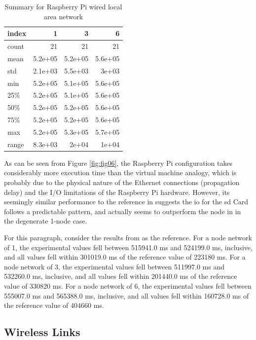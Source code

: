 \begin{table}
\begin{tabular}{lrrr}
\toprule
 index &       1 &       3 &       6 \\
\midrule
 count &      21 &      21 &      21 \\
  mean & 5.2e+05 & 5.2e+05 & 5.6e+05 \\
   std & 2.1e+03 & 5.5e+03 &   3e+03 \\
   min & 5.2e+05 & 5.1e+05 & 5.6e+05 \\
   25\% & 5.2e+05 & 5.1e+05 & 5.6e+05 \\
   50\% & 5.2e+05 & 5.2e+05 & 5.6e+05 \\
   75\% & 5.2e+05 & 5.2e+05 & 5.6e+05 \\
   max & 5.2e+05 & 5.3e+05 & 5.7e+05 \\
 range & 8.3e+03 &   2e+04 &   1e+04 \\
\bottomrule
\end{tabular}
\caption{Summary for Raspberry Pi wired local area network}
\label{table:rp_wired_summary_statistics}
\end{table}

As can be seen from Figure \ref{fig:fig06}, the Raspberry Pi configuration takes considerably more execution time than the virtual machine analogy, which is probably due to the physical nature of the Ethernet connections (propagation delay) and the I/O limitations of the Raspberry Pi hardware.  However, its seemingly similar performance to the reference in \cite{Abramova2014} suggests the \gls{io} for the \gls{sd} Card follows a predictable pattern, and actually seems to outperform the node in \cite{Abramova2014} in the degenerate 1-node case.

For this paragraph, consider the results from \cite{Abramova2014} as the reference.  For a node network of 1, the experimental values fell between 515941.0 ms and 524199.0 ms, inclusive, and all values fell within 301019.0 ms of the reference value of 223180 ms.  For a node network of 3, the experimental values fell between 511997.0 ms and 532260.0 ms, inclusive, and all values fell within 201440.0 ms of the reference value of 330820 ms.  For a node network of 6, the experimental values fell between 555007.0 ms and 565388.0 ms, inclusive, and all values fell within 160728.0 ms of the reference value of 404660 ms.  

\subsection{Wireless Links}

